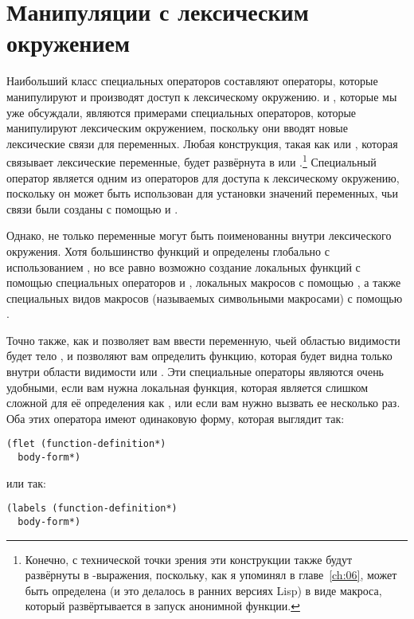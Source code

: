 \section{Манипуляции с лексическим окружением}

Наибольший класс специальных операторов составляют операторы, которые манипулируют и
производят доступ к лексическому окружению.  и , которые мы уже
обсуждали, являются примерами специальных операторов, которые манипулируют лексическим
окружением, поскольку они вводят новые лексические связи для переменных.  Любая
конструкция, такая как  или , которая связывает лексические
переменные, будет развёрнута в  или .\footnote{Конечно, с технической
  точки зрения эти конструкции также будут развёрнуты в -выражения,
  поскольку, как я упоминял в главе~\ref{ch:06},  может быть определена (и это
делалось в ранних версиях Lisp) в виде макроса, который развёртывается в запуск анонимной
функции.} Специальный оператор  является одним из операторов для доступа к
лексическому окружению, поскольку он может быть использован для установки значений
переменных, чьи связи были созданы с помощью  и .

Однако, не только переменные могут быть поименованны внутри лексического окружения.  Хотя
большинство функций и определены глобально с использованием , но все равно
возможно создание локальных функций с помощью специальных операторов  и
, локальных макросов с помощью , а также специальных видов
макросов (называемых символьными макросами) с помощью .

Точно также, как и  позволяет вам ввести переменную, чьей областью видимости
будет тело ,  и  позволяют вам определить функцию,
которая будет видна только внутри области видимости  или .  Эти
специальные операторы являются очень удобными, если вам нужна локальная функция, которая
является слишком сложной для её определения как , или если вам нужно вызвать
ее несколько раз.  Оба этих оператора имеют одинаковую форму, которая выглядит так:

\begin{lstlisting}
(flet (function-definition*)
  body-form*)
\end{lstlisting}

\noindent{}или так:

\begin{lstlisting}
(labels (function-definition*)
  body-form*)
\end{lstlisting}

